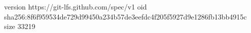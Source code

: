 version https://git-lfs.github.com/spec/v1
oid sha256:8f6f959534de729d99450a234b57de3eefdc4f205f5927d9e1286fb13bb4915c
size 33219
